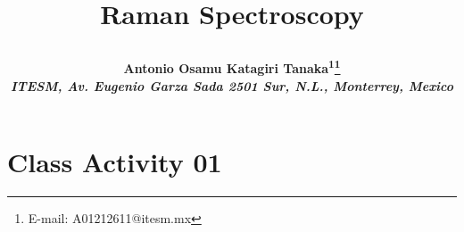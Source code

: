 \documentclass[11pt]{article}
\makeatletter
\def\NormalBaseline{\def\baselinestretch{1.1}}
\def\@shorttitle{\@empty}
\def\shorttitle#1{\gdef\@shorttitle{#1}}
\makeatother
\begin{document}
\renewcommand*\rmdefault{bch}\normalfont\upshape

\shorttitle{Class Assignment}

\date{}  

  
\title{\NormalBaseline\raggedright\bfseries Raman Spectroscopy}
  \let\origthanks\thanks
\renewcommand\thanks[1]{\begingroup\let\rlap\relax\origthanks{#1}\endgroup}
\author{\hskip2pc\parbox{.95\textwidth}{\bfseries\large Antonio Osamu Katagiri Tanaka\textsuperscript{1}\thanks{E-mail: A01212611@itesm.mx}
      \\[3pt] 
    \normalfont\itshape\NormalBaseline \textsuperscript{} 
    ITESM\unskip, \normalfont\itshape\NormalBaseline Av. Eugenio Garza Sada 2501 Sur\unskip, N.L.\unskip, Monterrey\unskip, Mexico}}
    
    
\maketitle 
\pagestyle{custom}

    
\section{Class Activity 01 \unskip~\protect\cite{693772:16778831}}
\end{document}
